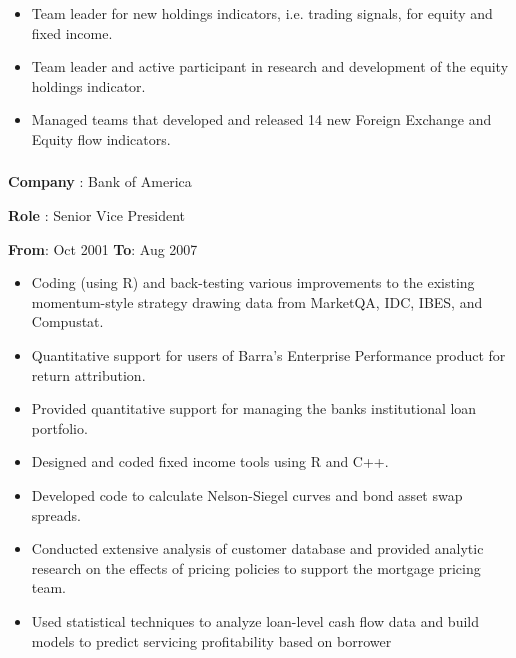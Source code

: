 \documentclass[
]{article}
\providecommand{\tightlist}{%
  \setlength{\itemsep}{0pt}\setlength{\parskip}{0pt}}
\begin{document}
{{\begin{itemize}
  \item
    Team leader for new holdings indicators, i.e. trading signals, for
    equity and fixed income.
  \item
    Team leader and active participant in research and development of
    the equity holdings indicator.
  \item
    Managed teams that developed and released 14 new Foreign Exchange
    and Equity flow indicators.
  \end{itemize}


\hypertarget{bofa}{\subsubsection{}\label{bofa}}
\begin{flushleft}
\textbf{Company} : Bank of America
\end{flushleft}

\begin{flushleft}
\textbf{Role} : Senior Vice President
\end{flushleft}
\textbf{From}: Oct 2001 \hspace{0.5in}  \textbf{To}: Aug 2007\\

  \begin{itemize}
  \tightlist
  \item
    Coding (using R) and back-testing various improvements to the
    existing momentum-style strategy drawing data from MarketQA, IDC,
    IBES, and Compustat.
  \item
    Quantitative support for users of Barra's Enterprise Performance
    product for return attribution.

  \item  Provided quantitative support for managing the banks institutional loan portfolio.
  \item
    Designed and coded fixed income tools using R and C++.
  \item
    Developed code to calculate Nelson-Siegel curves and bond asset swap
    spreads.

  \item   Conducted extensive analysis of customer database and provided
  analytic research on the effects of pricing policies to support the
  mortgage pricing team. 
  \item Used statistical techniques to analyze
  loan-level cash flow data and build models to predict servicing
  profitability based on borrower
  \end{itemize}

}}
\end{document}
